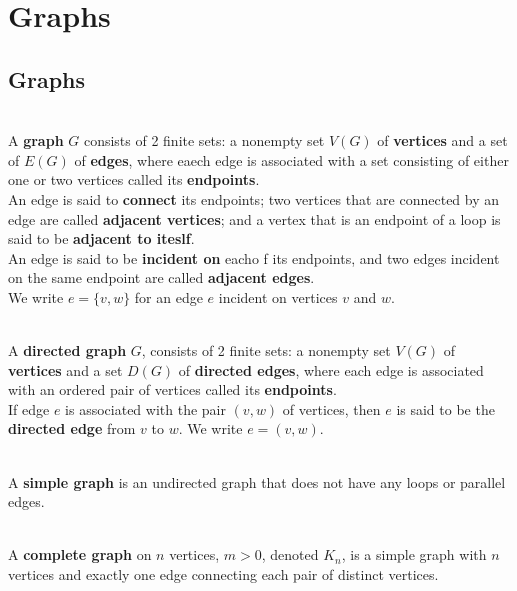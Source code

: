 \documentclass[12pt]{article}
\begin{document}
\section{Graphs}
\subsection{Graphs}
\begin{definition}[Graph]
\hfill\\
\normalfont A \textbf{graph} $G$ consists of 2 finite sets: a nonempty set $V(G)$ of \textbf{vertices} and a set of $E(G)$ of \textbf{edges}, where eaech edge is associated with a set consisting of either one or two vertices called its \textbf{endpoints}.\\
An edge is said to \textbf{connect} its endpoints; two vertices that are connected by an edge are called \textbf{adjacent vertices}; and a vertex that is an endpoint of a loop is said to be \textbf{adjacent to iteslf}.\\
An edge is said to be \textbf{incident on} eacho f its endpoints, and two edges incident on the same endpoint are called \textbf{adjacent edges}.\\
We write $e=\{v,w\}$ for an edge $e$ incident on vertices $v$ and $w$.
\end{definition}
\begin{definition}
\hfill\\
\normalfont A \textbf{directed graph} $G$, consists of 2 finite sets: a nonempty set $V(G)$ of \textbf{vertices} and a set $D(G)$ of \textbf{directed edges}, where each edge is associated with an ordered pair of vertices called its \textbf{endpoints}.\\
If edge $e$ is associated with the pair $(v,w)$ of vertices, then $e$ is said to be the \textbf{directed edge} from $v$ to $w$. We write $e=(v,w)$.
\end{definition}
\begin{definition}
\hfill\\
\normalfont A \textbf{simple graph} is an undirected graph that does not have any loops or parallel edges.
\end{definition}
\begin{definition}
\hfill\\
\normalfont A \textbf{complete graph} on $n$ vertices, $m>0$, denoted $K_n$, is a simple graph with $n$ vertices and exactly one edge connecting each pair of distinct vertices.
\end{definition}
\end{document}
